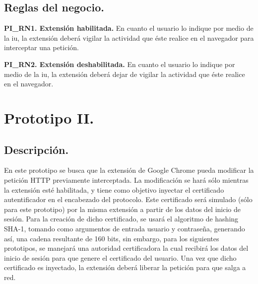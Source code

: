 \documentclass[12pt, a4paper, titlepage]{report}
\begin{document}
			\subsection{Reglas del negocio.}
				{\setlength{\parindent}{12pt}
			
				\textbf{PI\_RN1. Extensión habilitada.} En cuanto el usuario lo indique por medio de la \acrlong{iu}, la extensión deberá vigilar la actividad que éste realice en el navegador para interceptar una petición.\\
				\label{PI_RN1}
				
				\textbf{PI\_RN2. Extensión deshabilitada.} En cuanto el usuario lo indique por medio de la \acrlong{iu}, la extensión deberá dejar de vigilar la actividad que éste realice en el navegador.
				\label{PI_RN2}
				}
				
                \newpage
                
		
		\section{Prototipo II.}
		    \subsection{Descripción.}
		    En este prototipo se busca que la extensión de Google Chrome pueda modificar la petición HTTP previamente interceptada. La modificación se hará sólo mientras la extensión esté habilitada, y tiene como objetivo inyectar el certificado autentificador en el encabezado del protocolo. Este certificado será simulado (sólo para este prototipo) por la misma extensión a partir de los datos del inicio de sesión. Para la creación de dicho certificado, se usará el algoritmo de hashing SHA-1, tomando como argumentos de entrada usuario y contraseña, generando así, una cadena resultante de 160 bits, sin embargo, para los siguientes prototipos, se manejará una autoridad certificadora la cual recibirá los datos del inicio de sesión para que genere el certificado del usuario. Una vez que dicho certificado es inyectado, la extensión deberá liberar la petición para que salga a red.\\
		    
\end{document}
